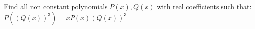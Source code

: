 Find all non constant polynomials $P(x),Q(x)$ with real coefficients such that: $P((Q(x))^3)=xP(x)(Q(x))^3$